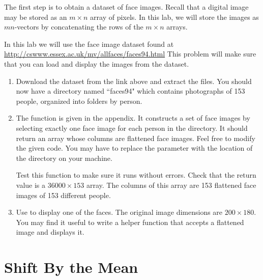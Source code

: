 The first step is to obtain a dataset of face images.
Recall that a digital image may be stored as an $m \times n$ array of pixels.
In this lab, we will store the images as $mn$-vectors by concatenating the rows of the $m \times n$ arrays.

\begin{problem}
\label{prob:getTrainingFaces}
In this lab we will use the  face image dataset found at \url{http://cswww.essex.ac.uk/mv/allfaces/faces94.html}
This problem will make sure that you can load and display the images from the dataset.
\begin{enumerate}
\item Download the  dataset from the link above and extract the files.
You should now have a directory named ``faces94" which contains photographs of 153 people, organized into folders by person.

\item The function  is given in the appendix. %
It constructs a set of face images by selecting exactly one face image for each person in the directory.
It should return an array whose columns are flattened face images.
Feel free to modify the given code.
You may have to replace the parameter  with the location of the directory  on your machine.

Test this function to make sure it runs without errors.
Check that the return value  is a $36000 \times 153$ array.
The columns of this array are 153 flattened face images of 153 different people.

\item Use  to display one of the faces.
The original image dimensions are $200 \times 180$.
You may find it useful to write a helper function that accepts a flattened image and displays it.

\end{enumerate}
\end{problem}


\section*{Shift By the Mean} %

